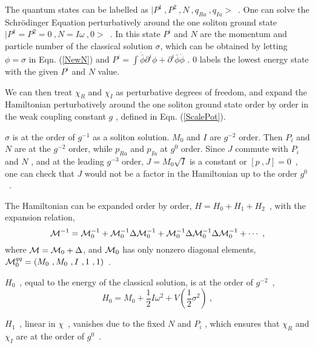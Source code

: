 \documentclass[a4paper,a4paper]{article}
\def\da{{\dot{a}}}
\begin{document}
The quantum states can be labelled as $|P^1\ ,P^2\ ,N\ ,q_{Ra}\ ,q_{I\da}>$\ . One can  
solve the Schr\"{o}dinger Equation perturbatively around the one soliton ground state 
$|P^1=P^2=0\ ,N=I\omega\ ,0>$\ . In this state $P^i$ and $N$ are the momentum and particle 
number of the classical solution $\sigma$, which can be obtained by letting $\phi=\sigma$ in 
Eqn. (\ref{NewN}) and $P^i=\int\dot{\bar{\phi}}\partial^i\phi+\partial^i\bar{\phi}\dot{\phi}$  
\cite{Xiong}. $0$ labels the lowest energy state with the given $P^i$ and $N$ value. 

We can then treat $\chi_R$ and $\chi_I$ as 
perturbative degrees of freedom, and expand the Hamiltonian perturbatively around the 
one soliton ground state order by  
order in the weak coupling constant $g$ , defined in Eqn. (\ref{ScalePot}).

$\sigma$ is at the order of $g^{-1}$ as a soliton solution. $M_0$ and $I$ are 
$g^{-2}$ order. Then $P_i$ and $N$ are at the $g^{-2}$ order, while $p_{Ra}$ and 
$p_{I\da}$ at $g^0$ order. 
Since $J$ commute with $P_i$ and $N$ , and at the leading $g^{-3}$ order, 
$J=M_0\sqrt{I}$ is a constant or $[p\ ,J]=0$\ , one can check that   
$J$ would not be a factor in the Hamiltonian up to the order $g^0$\ . 

The Hamiltonian can be expanded order by order, $H=H_0+H_1+H_2$\ ,
with the expansion relation, 
\begin{equation}
 {\cal M}^{-1}={\cal M}_0^{-1}+{\cal M}_0^{-1}\Delta{\cal M}_0^{-1}+
 {\cal M}_0^{-1}\Delta{\cal M}_0^{-1}\Delta{\cal M}_0^{-1}+\cdots\ , 
\end{equation}
where ${\cal M}={\cal M}_0+\Delta$, and ${\cal M}_0$ has only nonzero diagonal   
elements, ${\cal M}_0^{qq}=(M_0\ ,M_0\ ,I\ ,1\ ,1)$\ .  

$H_0$\ , equal to the energy of the
classical solution, is at the order of $g^{-2}$\ , 
\begin{equation}
  H_0=M_0+\frac 12I\omega^2+V(\frac 12\sigma^2)\ ,
\end{equation}

$H_1$\ , linear in $\chi$\ , vanishes due to the fixed $N$ and $P_i$ , 
which ensures that $\chi_R$ and $\chi_I$ are at the order of $g^0$\ .  
\end{document}

